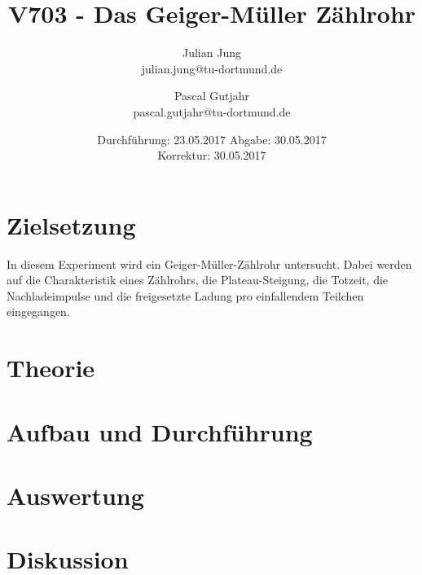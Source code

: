 

\title{V703 - Das Geiger-Müller Zählrohr}
\author{Julian Jung \\ julian.jung@tu-dortmund.de
  \and Pascal Gutjahr \\ pascal.gutjahr@tu-dortmund.de}
  \date{Durchführung: 23.05.2017
  \hspace{3em}
  Abgabe: 30.05.2017\\
  Korrektur: 30.05.2017}
  
\maketitle
\newpage
\tableofcontents
\newpage
\section{Zielsetzung}
In diesem Experiment wird ein Geiger-Müller-Zählrohr untersucht. Dabei werden auf
die Charakteristik eines Zählrohrs, die Plateau-Steigung, die Totzeit, die
Nachladeimpulse und die freigesetzte Ladung pro einfallendem Teilchen eingegangen.
\section{Theorie}
 
\section{Aufbau und Durchführung}
 
\section{Auswertung}
 
\section{Diskussion}

\printbibliography

